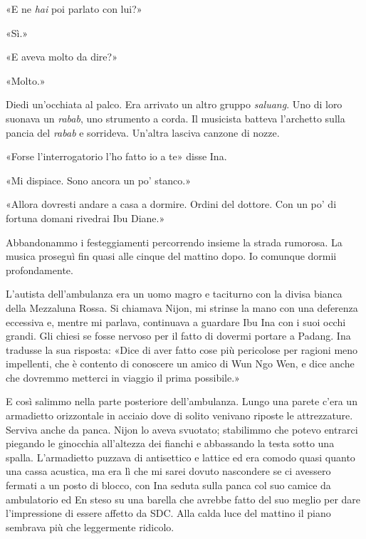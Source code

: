 «E ne \emph{hai} poi parlato con lui?»

«Sì.»

«E aveva molto da dire?»

«Molto.»

Diedi un'occhiata al palco. Era arrivato un altro gruppo \emph{saluang}.
Uno di loro suonava un \emph{rabab}, uno strumento a corda. Il musicista
batteva l'archetto sulla pancia del \emph{rabab} e sorrideva. Un'altra
lasciva canzone di nozze.

«Forse l'interrogatorio l'ho fatto io a te» disse Ina.

«Mi dispiace. Sono ancora un po' stanco.»

«Allora dovresti andare a casa a dormire. Ordini del dottore. Con un po'
di fortuna domani rivedrai Ibu Diane.»

Abbandonammo i festeggiamenti percorrendo insieme la strada rumorosa. La
musica proseguì fin quasi alle cinque del mattino dopo. Io comunque
dormii profondamente.

\separatorefiori

L'autista dell'ambulanza era un uomo magro e taciturno con la divisa
bianca della Mezzaluna Rossa. Si chiamava Nijon, mi strinse la mano con
una deferenza eccessiva e, mentre mi parlava, continuava a guardare Ibu
Ina con i suoi occhi grandi. Gli chiesi se fosse nervoso per il fatto di
dovermi portare a Padang. Ina tradusse la sua risposta: «Dice di aver
fatto cose più pericolose per ragioni meno impellenti, che è contento di
conoscere un amico di Wun Ngo Wen, e dice anche che dovremmo metterci in
viaggio il prima possibile.»

E così salimmo nella parte posteriore dell'ambulanza. Lungo una parete
c'era un armadietto orizzontale in acciaio dove di solito venivano
riposte le attrezzature. Serviva anche da panca. Nijon lo aveva
svuotato; stabilimmo che potevo entrarci piegando le ginocchia
all'altezza dei fianchi e abbassando la testa sotto una spalla.
L'armadietto puzzava di antisettico e lattice ed era comodo quasi quanto
una cassa acustica, ma era lì che mi sarei dovuto nascondere se ci
avessero fermati a un posto di blocco, con Ina seduta sulla panca col
suo camice da ambulatorio ed En steso su una barella che avrebbe fatto
del suo meglio per dare l'impressione di essere affetto da SDC. Alla
calda luce del mattino il piano sembrava più che leggermente ridicolo.

